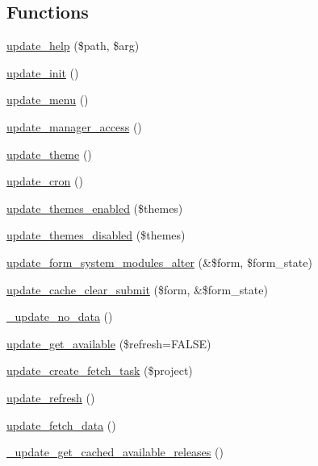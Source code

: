 \subsection*{Functions}
\begin{DoxyCompactItemize}
\item 
\hyperlink{update_8module_ae87a65e26562585148f48262a4c12914}{update\_\-help} (\$path, \$arg)
\item 
\hyperlink{update_8module_a54a6a1b199a781dd0eb8620a0cd87e85}{update\_\-init} ()
\item 
\hyperlink{update_8module_abfea1a759334c0461fa9ff2250bdfaaf}{update\_\-menu} ()
\item 
\hyperlink{update_8module_a898d2cad139371b7c3ab5e9463ceedf4}{update\_\-manager\_\-access} ()
\item 
\hyperlink{update_8module_a6146aad98ab9ceb29de1d9fe71161b15}{update\_\-theme} ()
\item 
\hyperlink{update_8module_aa03db4586231db9f453bd156d3b1f242}{update\_\-cron} ()
\item 
\hyperlink{update_8module_a66cb96d284e782a3207e4773749ad3e6}{update\_\-themes\_\-enabled} (\$themes)
\item 
\hyperlink{update_8module_ace87a8222bcba4e44e36395e081bd41a}{update\_\-themes\_\-disabled} (\$themes)
\item 
\hyperlink{update_8module_ac66abd85c8fc901932b73f874bee871b}{update\_\-form\_\-system\_\-modules\_\-alter} (\&\$form, \$form\_\-state)
\item 
\hyperlink{update_8module_a3b1cd668c7aa9cc82f1e05b5a046d04f}{update\_\-cache\_\-clear\_\-submit} (\$form, \&\$form\_\-state)
\item 
\hyperlink{update_8module_a959ca989c19a2a887014b7bb774fcba9}{\_\-update\_\-no\_\-data} ()
\item 
\hyperlink{update_8module_a683663ab0739a0d67fe3eb98f532c11c}{update\_\-get\_\-available} (\$refresh=FALSE)
\item 
\hyperlink{update_8module_abec25d4ee05c73f9417a4eb6e582351d}{update\_\-create\_\-fetch\_\-task} (\$project)
\item 
\hyperlink{update_8module_a601f9ec9c404ec41711b00884e7d0573}{update\_\-refresh} ()
\item 
\hyperlink{update_8module_a88528fa85108af5a0b26ab5b1d6fa8c2}{update\_\-fetch\_\-data} ()
\item 
\hyperlink{update_8module_a75a2b891e9225f86f6a856730a633a3f}{\_\-update\_\-get\_\-cached\_\-available\_\-releases} ()
\item 

\end{DoxyCompactItemize}
